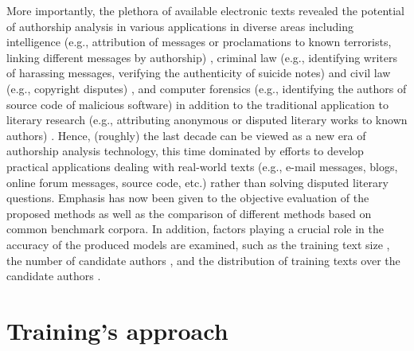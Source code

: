 More importantly, the plethora of available electronic texts revealed the potential of authorship analysis in various applications \cite{madigan2005author} in diverse areas including intelligence (e.g., attribution of messages or proclamations to known terrorists,
linking different messages by authorship) \cite{abbasi2005applying}, criminal law (e.g., identifying writers of harassing messages, verifying the authenticity of suicide notes) and
civil law (e.g., copyright disputes) \cite{chaski2005s}, and computer forensics (e.g., identifying the authors of source code of malicious software) \cite{frantzeskou2006effective} in addition to the traditional application to literary research (e.g., attributing anonymous or disputed literary works to known authors) \cite{burrows2002delta}. Hence, (roughly) the last decade can be viewed as a new era of authorship analysis technology, this time dominated by efforts to develop practical applications dealing with real-world texts (e.g., e-mail messages, blogs,
online forum messages, source code, etc.) rather than solving disputed literary questions. Emphasis has now been given to the objective evaluation of the proposed methods as well
as the comparison of different methods based on common benchmark corpora. In addition, factors playing a crucial role in the accuracy of the produced models are examined, such as the training text size \cite{marton2005compression}, the number
of candidate authors \cite{koppel2006authorship}, and the distribution of training texts over the candidate authors \cite{stamatatos2008author}.

\section{Training's approach}

